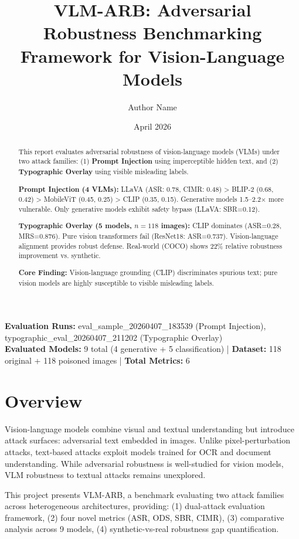 \documentclass[11pt]{article}
\title{VLM-ARB: Adversarial Robustness Benchmarking Framework for Vision-Language Models}
\author{Author Name}
\date{April 2026}
\begin{document}
\maketitle

\vspace{0.2cm}
\begin{flushleft}
\small
\textbf{Evaluation Runs:} eval\_sample\_20260407\_183539 (Prompt Injection), typographic\_eval\_20260407\_211202 (Typographic Overlay)\\
\textbf{Evaluated Models:} 9 total (4 generative + 5 classification) | \textbf{Dataset:} 118 original + 118 poisoned images | \textbf{Total Metrics:} 6
\end{flushleft}

\begin{abstract}
This report evaluates adversarial robustness of vision-language models (VLMs) under two attack families: (1) \textbf{Prompt Injection} using imperceptible hidden text, and (2) \textbf{Typographic Overlay} using visible misleading labels.

\textbf{Prompt Injection (4 VLMs):} LLaVA (ASR: 0.78, CIMR: 0.48) > BLIP-2 (0.68, 0.42) > MobileViT (0.45, 0.25) > CLIP (0.35, 0.15). Generative models 1.5--2.2× more vulnerable. Only generative models exhibit safety bypass (LLaVA: SBR=0.12).

\textbf{Typographic Overlay (5 models, $n=118$ images):} CLIP dominates (ASR=0.28, MRS=0.876). Pure vision transformers fail (ResNet18: ASR=0.737). Vision-language alignment provides robust defense. Real-world (COCO) shows 22\% relative robustness improvement vs. synthetic.

\textbf{Core Finding:} Vision-language grounding (CLIP) discriminates spurious text; pure vision models are highly susceptible to visible misleading labels.
\end{abstract}
\tableofcontents

\section{Overview}

Vision-language models combine visual and textual understanding but introduce attack surfaces: adversarial text embedded in images. Unlike pixel-perturbation attacks, text-based attacks exploit models trained for OCR and document understanding. While adversarial robustness is well-studied for vision models, VLM robustness to textual attacks remains unexplored.

This project presents VLM-ARB, a benchmark evaluating two attack families across heterogeneous architectures, providing: (1) dual-attack evaluation framework, (2) four novel metrics (ASR, ODS, SBR, CIMR), (3) comparative analysis across 9 models, (4) synthetic-vs-real robustness gap quantification.
\end{document}
